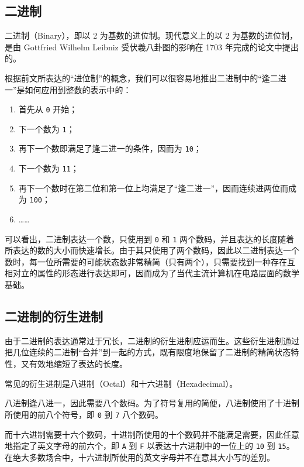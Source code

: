     \subsection{二进制}\label{subsec:NumberSystemBasics/positional-notation/binary}
        二进制（Binary），即以 2 为基数的进位制。现代意义上的以 2 为基数的进位制，是由 Gottfried Wilhelm Leibniz 受伏羲八卦图的影响在 1703 年完成的论文\cite{leibniz-binary}中提出的。

        根据前文所表达的“进位制”的概念，我们可以很容易地推出二进制中的“逢二进一”是如何应用到整数的表示中的：
        \begin{enumerate}[start = 0]
            \item 首先从 \texttt{0} 开始；
            \item 下一个数为 \texttt{1}；
            \item 再下一个数即满足了逢二进一的条件，因而为 \texttt{10}；
            \item 下一个数为 \texttt{11}；
            \item 再下一个数时在第二位和第一位上均满足了“逢二进一”，因而连续进两位而成为 \texttt{100}；
            \item ……
        \end{enumerate}

        可以看出，二进制表达一个数，只使用到 \texttt{0} 和 \texttt{1} 两个数码，并且表达的长度随着所表达的数的大小而快速增长。由于其只使用了两个数码，因此以二进制表达一个数时，每一位所需要的可能状态数非常精简（只有两个），只需要找到一种存在互相对立的属性的形态进行表达即可，因而成为了当代主流计算机在电路层面的数学基础。
    \subsection{二进制的衍生进制}\label{subsec:NumberSystemBasics/positional-notation/binary-derivation}
        由于二进制的表达通常过于冗长，二进制的衍生进制应运而生。这些衍生进制通过把几位连续的二进制“合并”到一起的方式，既有限度地保留了二进制的精简状态特性，又有效地缩短了表达的长度。

        常见的衍生进制是八进制（Octal）和十六进制（Hexadecimal）。

        八进制逢八进一，因此需要八个数码。为了符号复用的简便，八进制使用了十进制所使用的前八个符号，即 \texttt{0} 到 \texttt{7} 八个数码。

        而十六进制需要十六个数码，十进制所使用的十个数码并不能满足需要，因此任意地指定了英文字母的前六个，即 \texttt{A} 到 \texttt{F} 以表达十六进制中的一位上的 \texttt{10} 到 \texttt{15}。在绝大多数场合中，十六进制所使用的英文字母并不在意其大小写的差别。
